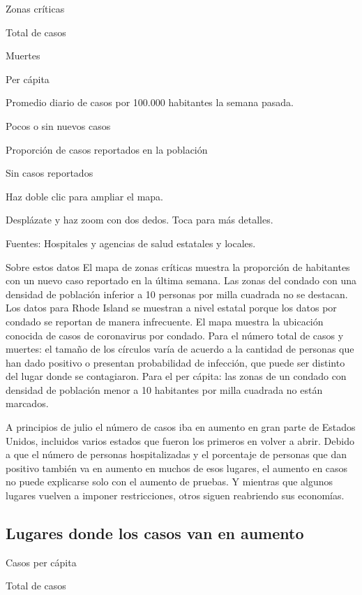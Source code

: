 Zonas críticas

Total de casos

Muertes

Per cápita

Promedio diario de casos por 100.000 habitantes la semana pasada.

Pocos o sin nuevos casos

Proporción de casos reportados en la población

Sin casos reportados

Haz doble clic para ampliar el mapa.

Desplázate y haz zoom con dos dedos. Toca para más detalles.

Fuentes: Hospitales y agencias de salud estatales y locales.

Sobre estos datos El mapa de zonas críticas muestra la proporción de
habitantes con un nuevo caso reportado en la última semana. Las zonas
del condado con una densidad de población inferior a 10 personas por
milla cuadrada no se destacan. Los datos para Rhode Island se muestran a
nivel estatal porque los datos por condado se reportan de manera
infrecuente. El mapa muestra la ubicación conocida de casos de
coronavirus por condado. Para el número total de casos y muertes: el
tamaño de los círculos varía de acuerdo a la cantidad de personas que
han dado positivo o presentan probabilidad de infección, que puede ser
distinto del lugar donde se contagiaron. Para el per cápita: las zonas
de un condado con densidad de población menor a 10 habitantes por milla
cuadrada no están marcados.

A principios de julio el número de casos iba en aumento en gran parte de
Estados Unidos, incluidos varios estados que fueron los primeros en
volver a abrir. Debido a que el número de personas hospitalizadas y el
porcentaje de personas que dan positivo también va en aumento en muchos
de esos lugares, el aumento en casos no puede explicarse solo con el
aumento de pruebas. Y mientras que algunos lugares vuelven a imponer
restricciones, otros siguen reabriendo sus economías.

\hypertarget{lugares-donde-los-casos-van-en-aumento}{%
\subsection{Lugares donde los casos van en
aumento}\label{lugares-donde-los-casos-van-en-aumento}}

Casos per cápita

Total de casos

